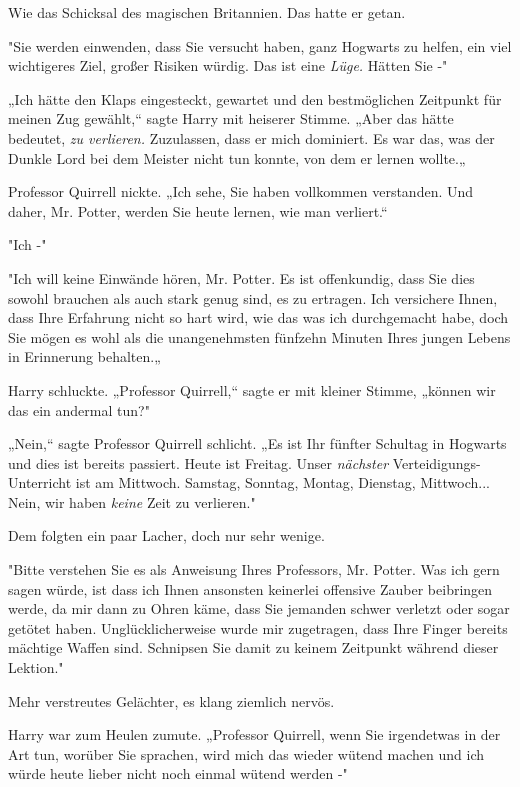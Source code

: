 {Wie das Schicksal des magischen Britannien. Das hatte er getan.

"Sie werden einwenden, dass Sie versucht haben, ganz Hogwarts zu helfen, ein viel wichtigeres Ziel, großer Risiken würdig. Das ist eine \emph{Lüge.} Hätten Sie -"

„Ich hätte den Klaps eingesteckt, gewartet und den bestmöglichen Zeitpunkt für meinen Zug gewählt,“ sagte Harry mit heiserer Stimme. „Aber das hätte bedeutet, \emph{zu verlieren.} Zuzulassen, dass er mich dominiert. Es war das, was der Dunkle Lord bei dem Meister nicht tun konnte, von dem er lernen wollte.„

Professor Quirrell nickte. „Ich sehe, Sie haben vollkommen verstanden. Und daher, Mr. Potter, werden Sie heute lernen, wie man verliert.“

"Ich -"

"Ich will keine Einwände hören, Mr. Potter. Es ist offenkundig, dass Sie dies sowohl brauchen als auch stark genug sind, es zu ertragen. Ich versichere Ihnen, dass Ihre Erfahrung nicht so hart wird, wie das was ich durchgemacht habe, doch Sie mögen es wohl als die unangenehmsten fünfzehn Minuten Ihres jungen Lebens in Erinnerung behalten.„

Harry schluckte. „Professor Quirrell,“ sagte er mit kleiner Stimme, „können wir das ein andermal tun?"

„Nein,“ sagte Professor Quirrell schlicht. „Es ist Ihr fünfter Schultag in Hogwarts und dies ist bereits passiert. Heute ist Freitag. Unser \emph{nächster} Verteidigungs-Unterricht ist am Mittwoch. Samstag, Sonntag, Montag, Dienstag, Mittwoch... Nein, wir haben \emph{keine} Zeit zu verlieren."

Dem folgten ein paar Lacher, doch nur sehr wenige.

"Bitte verstehen Sie es als Anweisung Ihres Professors, Mr. Potter. Was ich gern sagen würde, ist dass ich Ihnen ansonsten keinerlei offensive Zauber beibringen werde, da mir dann zu Ohren käme, dass Sie jemanden schwer verletzt oder sogar getötet haben. Unglücklicherweise wurde mir zugetragen, dass Ihre Finger bereits mächtige Waffen sind. Schnipsen Sie damit zu keinem Zeitpunkt während dieser Lektion."

Mehr verstreutes Gelächter, es klang ziemlich nervös.

Harry war zum Heulen zumute. „Professor Quirrell, wenn Sie irgendetwas in der Art tun, worüber Sie sprachen, wird mich das wieder wütend machen und ich würde heute lieber nicht noch einmal wütend werden -"

}

